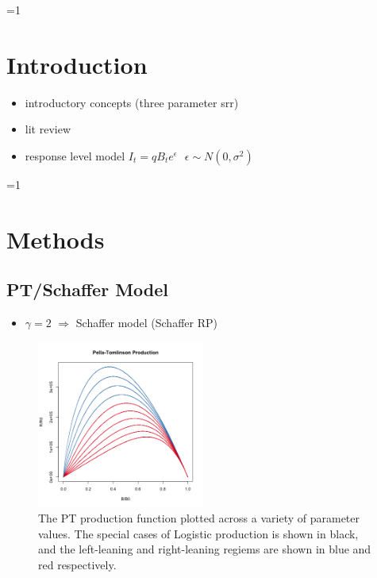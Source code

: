 \documentclass[12pt]{article}
\newcounter{alphasect}
\def\alphainsection{0}
\let\oldsection=\section
\def\section{%
  \ifnum\alphainsection=1%
    \addtocounter{alphasect}{1}
  \fi%
\oldsection}%
\begin{document}
%
\clearpage

%
\section{Introduction\label{int}}
\begin{itemize}
	\item introductory concepts (three parameter srr)
	\item lit review
	\item response level model $I_t = q B_t e^\epsilon ~~~ \epsilon\sim N(0, \sigma^2)$
\end{itemize}

%
\clearpage
\section{Methods \label{meth}}

%
\subsection{PT/Schaffer Model}
	\begin{itemize}
		\item $\gamma=2$ $\Rightarrow$ Schaffer model (Schaffer RP)
	\end{itemize}

%
\begin{figure}
\vspace{-2cm}
\includegraphics[width=0.49\textwidth]{../ptNew/g4PTLog.png}
\vspace{-1cm}
\caption{
The PT production function plotted across a variety of parameter
values. The special cases of Logistic production is shown in black, and the 
left-leaning and right-leaning regiems are shown in blue and red respectively.
}
\label{srrPT}
\end{figure}
\end{document}
